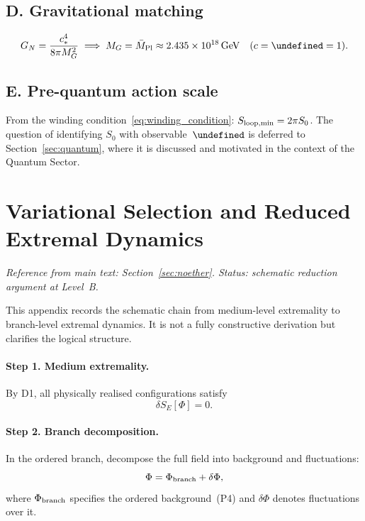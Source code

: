 \documentclass[11pt,a4paper]{article}
\let\hbar\undefined
\numberwithin{equation}{section}
\begin{document}
\subsection*{D. Gravitational matching}

\[
  G_N = \frac{c_*^4}{8\pi M_G^2}
  \;\Longrightarrow\;
  M_G = \bar{M}_{\rm Pl} \approx 2.435\times 10^{18}\,\text{GeV}
  \quad (c=\hbar=1).
\]

\subsection*{E. Pre-quantum action scale}

From the winding condition~\eqref{eq:winding_condition}:
$S_{\rm loop,min}=2\pi S_0$.
The question of identifying $S_0$ with observable~$\hbar$
is deferred to Section~\ref{sec:quantum}, where it is
discussed and motivated in the context of the Quantum Sector.



\section{Variational Selection and Reduced Extremal Dynamics}
\label{app:variational_reduction}

\textit{Reference from main text:
Section~\ref{sec:noether}.
Status: schematic reduction argument at Level~B.}

This appendix records the schematic chain from medium-level extremality
to branch-level extremal dynamics.
It is not a fully constructive derivation but clarifies the logical
structure.

\paragraph{Step 1. Medium extremality.}
By D1, all physically realised configurations satisfy
\begin{equation}
  \delta S_E[\Phi] = 0.
  \label{eq:app_medium_ext}
\end{equation}

\paragraph{Step 2. Branch decomposition.}
In the ordered branch, decompose the full field into background and
fluctuations:
\begin{equation}
  \Phi = \Phi_{\rm branch} + \delta\Phi,
\end{equation}
where $\Phi_{\rm branch}$ specifies the ordered background~(P4) and
$\delta\Phi$ denotes fluctuations over it.
\end{document}
